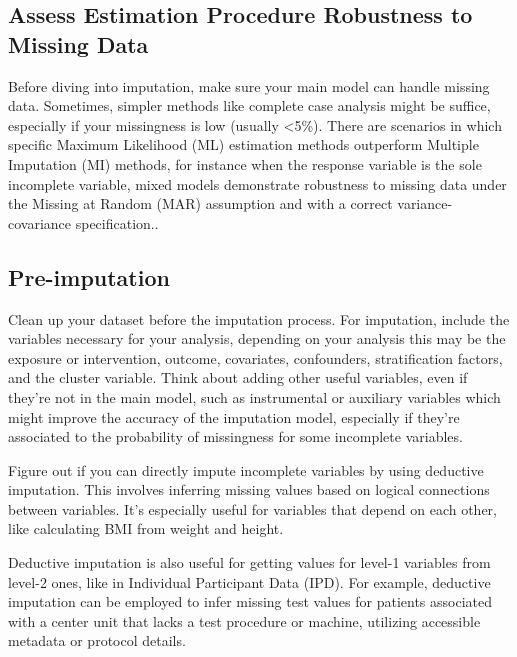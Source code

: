 \documentclass[
  article]{jss}
\begin{document}
\hypertarget{assess-estimation-procedure-robustness-to-missing-data}{%
\subsection{Assess Estimation Procedure Robustness to Missing
Data}\label{assess-estimation-procedure-robustness-to-missing-data}}

Before diving into imputation, make sure your main model can handle
missing data. Sometimes, simpler methods like complete case analysis
might be suffice, especially if your missingness is low (usually
\textless5\%). There are scenarios in which specific Maximum Likelihood
(ML) estimation methods outperform Multiple Imputation (MI) methods, for
instance when the response variable is the sole incomplete variable,
mixed models demonstrate robustness to missing data under the Missing at
Random (MAR) assumption and with a correct variance-covariance
specification.\cite{molenberghs2007}.

\hypertarget{pre-imputation}{%
\subsection{Pre-imputation}\label{pre-imputation}}

Clean up your dataset before the imputation process. For imputation,
include the variables necessary for your analysis, depending on your
analysis this may be the exposure or intervention, outcome, covariates,
confounders, stratification factors, and the cluster variable. Think
about adding other useful variables, even if they're not in the main
model, such as instrumental or auxiliary variables which might improve
the accuracy of the imputation model, especially if they're associated
to the probability of missingness for some incomplete variables.

Figure out if you can directly impute incomplete variables by using
deductive imputation. This involves inferring missing values based on
logical connections between variables. It's especially useful for
variables that depend on each other, like calculating BMI from weight
and height.

Deductive imputation is also useful for getting values for level-1
variables from level-2 ones, like in Individual Participant Data (IPD).
For example, deductive imputation can be employed to infer missing test
values for patients associated with a center unit that lacks a test
procedure or machine, utilizing accessible metadata or protocol details.
\end{document}

